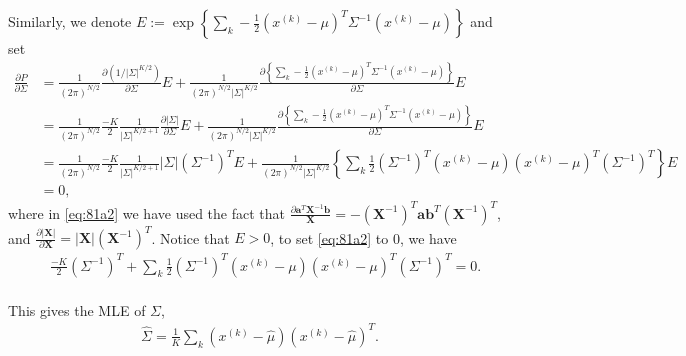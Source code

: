 \documentclass{article}
\newcommand{\bm}{\mathbf}
\begin{document}
Similarly, we denote $E := \exp\left\{\sum_k -\frac{1}{2}(x^{(k)}-\mu)^T\Sigma^{-1}(x^{(k)}-\mu)\right\}$ and set
\begin{align}
	\frac{\partial P}{\partial \Sigma} &= 
	\frac{1}{(2\pi)^{N/2}}\frac{\partial
	\left(1/|\Sigma|^{K/2}\right)}{\partial \Sigma}E +
	\frac{1}{(2\pi)^{N/2}|\Sigma|^{K/2}}
	\frac{\partial\left\{\sum_k -\frac{1}{2}(x^{(k)}-\mu)^T
	\Sigma^{-1}(x^{(k)}-\mu)\right\}}{\partial \Sigma}E\\
	&= \frac{1}{(2\pi)^{N/2}} \frac{-K}{2}\frac{1}
	{|\Sigma|^{K/2 + 1}}\frac{\partial |\Sigma|}{\partial \Sigma}E + 
	\frac{1}{(2\pi)^{N/2}|\Sigma|^{K/2}}
	\frac{\partial\left\{\sum_k -\frac{1}{2}(x^{(k)}-\mu)^T
	\Sigma^{-1}(x^{(k)}-\mu)\right\}}{\partial \Sigma}E\\
	&=\frac{1}{(2\pi)^{N/2}} \frac{-K}{2}\frac{1}
	{|\Sigma|^{K/2 + 1}}|\Sigma|(\Sigma^{-1})^T E +
	\frac{1}{(2\pi)^{N/2}|\Sigma|^{K/2}}
    \left\{\sum_k \frac{1}{2}(\Sigma^{-1})^T (x^{(k)}-\mu)
	(x^{(k)}-\mu)^T(\Sigma^{-1})^T\right\}E \label{eq:81a2}\\
	&=0,
\end{align}
%
where in \eqref{eq:81a2} we have used the fact that $\frac{\partial\bm{a}^T\bm{X}^{-1}\bm{b}}{\bm{X}}=-(\bm{X}^{-1})^T\bm{a}\bm{b}^T(\bm{X}^{-1})^T$, and $\frac{\partial|\bm{X}|}{\partial \bm{X}} = |\bm{X}|(\bm{X}^{-1})^T$. Notice that $E>0$,
to set \eqref{eq:81a2} to 0, we have
\begin{align}
	&\frac{-K}{2}(\Sigma^{-1})^T +
    \sum_k \frac{1}{2}(\Sigma^{-1})^T (x^{(k)}-\mu)
	(x^{(k)}-\mu)^T(\Sigma^{-1})^T = 0.\\
\end{align}

This gives the MLE of $\Sigma$,
\begin{align}
	\hat{\Sigma} = \frac{1}{K}\sum_k (x^{(k)}-\hat{\mu})
	(x^{(k)}-\hat{\mu})^T.
\end{align}
\\
\end{document}
